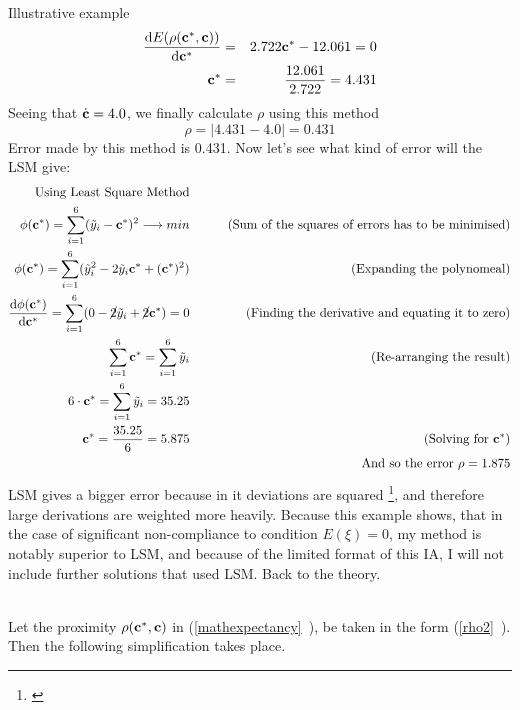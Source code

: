 \begin{subsection}{Illustrative example}
\begin{eqnarray*}
\frac{\mathrm{d}E(\rho(\textbf{c}^{*},\textbf{c}))}{\mathrm{d}\textbf{c}^{*}} &=& 2.722\textbf{c}^{*}-12.061 = 0 \\
\textbf{c}^{*} &=& \frac{12.061}{2.722} = 4.431
\end{eqnarray*}
Seeing that $\dot{\textbf{c}} = 4.0$, we finally calculate $\rho$ using this method
\begin{equation*}
\rho = |4.431-4.0| = 0.431
\end{equation*}
Error made by this method is 0.431. Now let's see what kind of error will the LSM give:
\begin{eqnarray*}
\text{Using Least Square Method} \\
\phi(\textbf{c}^{*})= \sum\limits_{i=1}^{6}(\tilde{y}_{i}-\textbf{c}^{*})^{2} \longrightarrow min &\qquad & \text{(Sum of the squares of errors has to be minimised)}\\
\phi(\textbf{c}^{*})= \sum\limits_{i=1}^{6}(\tilde{y}_{i}^{2}-2 \tilde{y}_{i}\textbf{c}^{*} + (\textbf{c}^{*})^{2}) &\qquad & \text{(Expanding the polynomeal)}\\
\frac{\mathrm{d}\phi(\textbf{c}^{*})}{\mathrm{d}\textbf{c}^{*}} =  \sum\limits_{i=1}^{6}(0 -\cancel{2} \tilde{y}_{i} +\cancel{2} \textbf{c}^{*}) = 0  &\qquad & \text{(Finding the derivative and equating it to zero)}\\
 \sum\limits_{i=1}^{6}\textbf{c}^{*} = \sum\limits_{i=1}^{6} \tilde{y}_{i} &\qquad & \text{(Re-arranging the result)}\\
 6 \cdot \textbf{c}^{*} = \sum\limits_{i=1}^{6} \tilde{y}_{i} = 35.25 &\qquad & \\
 \textbf{c}^{*} = \frac{35.25}{6} = 5.875 &\qquad & \text{(Solving for $\textbf{c}^{*}$)}\\
& \qquad & \text{And so the error } \rho = 1.875
\end{eqnarray*}
LSM gives a bigger error because in it deviations are squared \footnote{\cite{Plackett_1950}}, and therefore large derivations are weighted more heavily. Because this example shows, that in the case of significant non-compliance to condition $E(\xi)=0$, my method is notably superior to LSM, and because of the limited format of this IA, I will not include further solutions that used LSM. %
 Back to the theory.\\
\\
\end{subsection}
Let the proximity $\rho(\textbf{c}^{*},\textbf{c})$ in (\vref{mathexpectancy}~), be taken in the form (\vref{rho2}~). Then the following simplification takes place.
